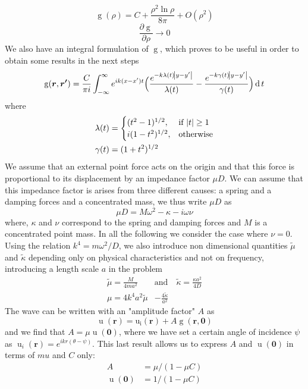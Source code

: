\documentclass[11pt]{report}
\numberwithin{equation}{section}
\begin{document}
%
$$\operatorname{g}(\rho) = C + \frac{\rho^2 \ln \rho} {8 \pi} + O(\rho^2)$$
%
$$ \frac{\partial \operatorname{g}}{\partial \rho } \rightarrow 0$$
%
We also have an integral formulation of $\operatorname{g}$, which proves to be useful in order to obtain some results in the next steps
%
\begin{equation} \label{integral}
    \operatorname{g}(\bm{r},\bm{r'}) = \frac{C}{\pi i} \int_{-\infty}^{\infty}  e^{i k (x-x') t} \Big(\frac{e^{-k \lambda(t) \abs{y-y'}}}{\lambda(t)} - \frac{e^{-k \gamma(t) \abs{y-y'}}}{\gamma(t)}\Big) \operatorname{d}t
\end{equation}
%
where
%
\begin{align}
    \lambda(t) &= \begin{cases}
    (t^2-1)^{1/2},& \text{if } \abs{t} \geq 1\\
    i(1-t^2)^{1/2},              & \text{otherwise}
\end{cases}\\
    \gamma(t) &= (1+t^2)^{1/2}
\end{align}
%
We assume that an external point force acts on the origin and that this force is proportional to its displacement by an impedance factor $\mu D$. We can assume that this impedance factor is arises from three different causes: a spring and a damping forces and a concentrated mass, we thus write $\mu D$ as
%
\begin{equation}
    \mu D = M\omega^2 - \kappa - i \omega \nu
\end{equation}
%
where, $\kappa$ and $\nu$ correspond to the spring and damping forces and $M$ is a concentrated point mass. In all the following we consider the case where $\nu = 0$. Using the relation $k^4=m\omega^2/D$, we also introduce non dimensional quantities $\tilde{\mu}$ and $\tilde{\kappa}$ depending only on physical characteristics and not on frequency, introducing a length scale $a$ in the problem
%
\begin{align}
    \tilde{\mu} = \frac{M}{4 m a^2} \quad &\textrm{and} \quad \tilde{\kappa} = \frac{\kappa a^2}{4D}\\
    \mu = 4 k^4 a^2 \tilde{\mu} &- \frac{4 \tilde{\kappa}}{a^2}  
\end{align}
%
The wave can be written with an "amplitude factor" $A$ as
%
\begin{equation} \label{depl}
    \operatorname{u}(\bm{r}) = \operatorname{u_i}(\bm{r}) + A\operatorname{g}(\bm{r},\bm{0})
\end{equation}
%
and we find that $A  = \mu \operatorname{u}(\bm{0})$, where we have set a certain angle of incidence $\psi$ as $\operatorname{u}_i(\textbf{r}) = e^{ikr(\theta-\psi)}$. This last result allows us to express $A$ and $\operatorname{u}(\bm{0})$ in terms of $mu$ and $C$ only:
%
\begin{align*} 
A &= \mu/(1-\mu C) \\ 
\operatorname{u}(\bm{0}) &= 1/(1-\mu C)
\end{align*}
%
\end{document}
